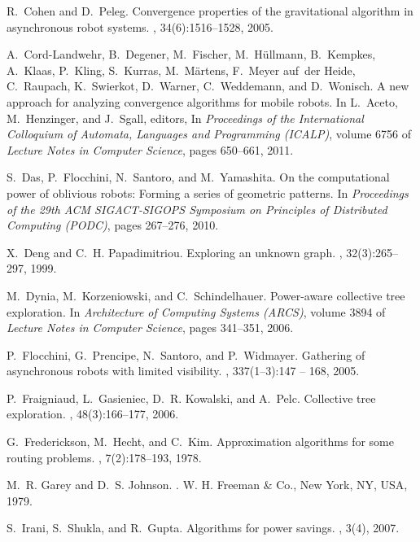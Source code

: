 \documentclass{article}
\begin{document}
\begin{thebibliography}{10}
R.~Cohen and D.~Peleg.
\newblock Convergence properties of the gravitational algorithm in asynchronous
  robot systems.
, 34(6):1516--1528, 2005.

A.~Cord-Landwehr, B.~Degener, M.~Fischer, M.~Hüllmann, B.~Kempkes, A.~Klaas,
  P.~Kling, S.~Kurras, M.~Märtens, F.~Meyer auf~der Heide, C.~Raupach,
  K.~Swierkot, D.~Warner, C.~Weddemann, and D.~Wonisch.
\newblock A new approach for analyzing convergence algorithms for mobile
  robots.
\newblock In L.~Aceto, M.~Henzinger, and J.~Sgall, editors, In {\em Proceedings of the International
  Colloquium of Automata, Languages and Programming (ICALP)}, volume 6756 of
  {\em Lecture Notes in Computer Science}, pages 650--661, 2011.

S.~Das, P.~Flocchini, N.~Santoro, and M.~Yamashita.
\newblock On the computational power of oblivious robots: Forming a series of
  geometric patterns.
\newblock In {\em Proceedings of the 29th ACM SIGACT-SIGOPS Symposium on
  Principles of Distributed Computing (PODC)}, pages 267--276, 2010.

X.~Deng and C.~H. Papadimitriou.
\newblock Exploring an unknown graph.
, 32(3):265--297, 1999.


M.~Dynia, M.~Korzeniowski, and C.~Schindelhauer.
\newblock Power-aware collective tree exploration.
\newblock In {\em Architecture of Computing Systems (ARCS)}, volume 3894 of {\em Lecture Notes in
  Computer Science}, pages 341--351, 2006.

P.~Flocchini, G.~Prencipe, N.~Santoro, and P.~Widmayer.
\newblock Gathering of asynchronous robots with limited visibility.
, 337(1–3):147 -- 168, 2005.

P.~Fraigniaud, L.~Gasieniec, D.~R. Kowalski, and A.~Pelc.
\newblock Collective tree exploration.
, 48(3):166--177, 2006.

G.~Frederickson, M.~Hecht, and C.~Kim.
\newblock Approximation algorithms for some routing problems.
, 7(2):178--193, 1978.

M.~R. Garey and D.~S. Johnson.
.
\newblock W. H. Freeman \& Co., New York, NY, USA, 1979.

S.~Irani, S.~Shukla, and R.~Gupta.
\newblock Algorithms for power savings.
, 3(4), 2007.


\end{thebibliography}
\end{document}
